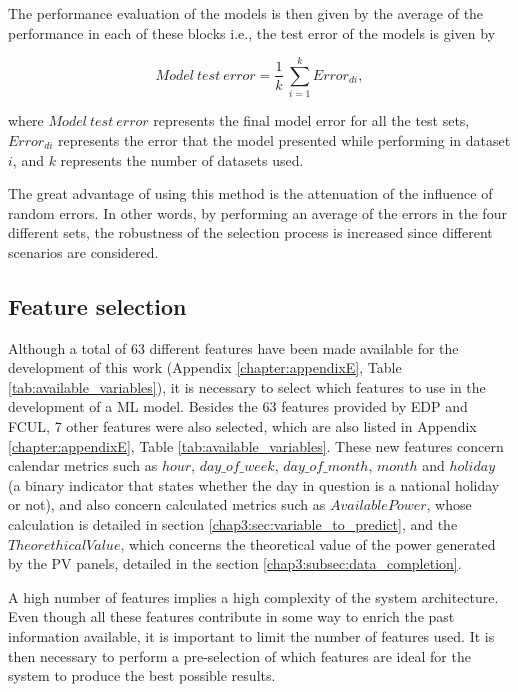 The performance evaluation of the models is then given by the average of the performance in each of these blocks i.e., the test error of the models is given by

\begin{equation}
     Model\ test\ error =\frac {1}{k}\ \sum_{i=1}^k Error_{di},
\label{err_av}
\end{equation}

where $Model\ test\ error$ represents the final model error for all the test sets, $Error_{di}$ represents the error that the model presented while performing in dataset $i$, and $k$ represents the number of datasets used.

The great advantage of using this method is the attenuation of the influence of random errors. In other words, by performing an average of the errors in the four different sets, the robustness of the selection process is increased since different scenarios are considered.


\subsection{Feature selection}\label{chap3:subsec:feature_selection}

Although a total of 63 different features have been made available for the development of this work (Appendix \ref{chapter:appendixE}, Table \ref{tab:available_variables}), it is necessary to select which features to use in the development of a \ac{ML} model. Besides the 63 features provided by \ac{EDP} and \ac{FCUL}, 7 other features were also selected, which are also listed in Appendix \ref{chapter:appendixE}, Table \ref{tab:available_variables}. These new features concern calendar metrics such as $hour$, $day\_of\_week$, $day\_of\_month$, $month$ and $holiday$ (a binary indicator that states whether the day in question is a national holiday or not), and also concern calculated metrics such as $AvailablePower$, whose calculation is detailed in section \ref{chap3:sec:variable_to_predict}, and the $TheorethicalValue$, which concerns the theoretical value of the power generated by the \ac{PV} panels, detailed in the section \ref{chap3:subsec:data_completion}. 

A high number of features implies a high complexity of the system architecture. Even though all these features contribute in some way to enrich the past information available, it is important to limit the number of features used. It is then necessary to perform a pre-selection of which features are ideal for the system to produce the best possible results. 

